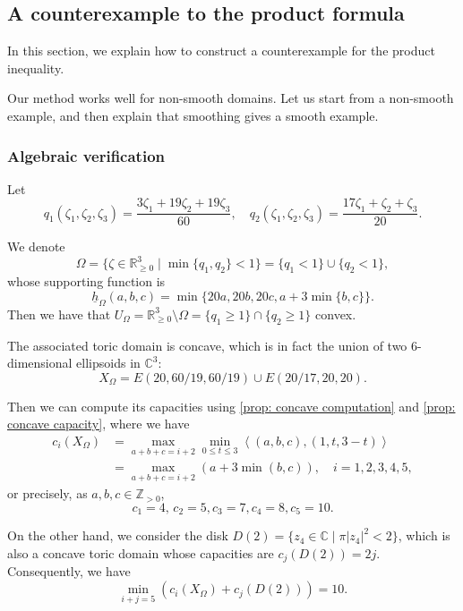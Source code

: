 \documentclass[11pt]{amsart}
\numberwithin{equation}{section}
\theoremstyle{plain}
\theoremstyle{definition}
\theoremstyle{remark}
\newcommand{\bC} { {\mathbb{C}}}
\newcommand{\bZ} { {\mathbb{Z}}}
\newcommand{\bR} { {\mathbb{R}}}
\begin{document}
\subsection{A counterexample to the product formula}\label{section: product counterexample}

In this section, we explain how to construct a counterexample for the product inequality. 

Our method works well for non-smooth domains. Let us start from a non-smooth example, and then explain that smoothing gives a smooth example.
\subsubsection{Algebraic verification}


Let 
\begin{equation}\label{equation: defining function for the product example, concave factor}
q_1(\zeta_1,\zeta_2,\zeta_3)=\frac{3\zeta_1+19\zeta_2+19\zeta_3}{60},\quad q_2(\zeta_1,\zeta_2,\zeta_3)=\frac{17\zeta_1+\zeta_2+\zeta_3}{20}.    
\end{equation}

We denote
\[\Omega=\{\zeta\in \bR^3_{\geq 0}\mid \min\{q_1,q_2\}<1\}=\{q_1<1\}\cup \{q_2<1\},\]
whose supporting function is
\[\underline{h}_\Omega(a,b,c)=\min\{20a,20b,20c,a+3\min\{b,c\}\}.\]
Then we have that $U_\Omega=\bR^3_{\geq 0}\setminus \Omega=\{q_1\geq 1\}\cap \{q_2\geq 1\}$ convex. 

The associated toric domain is concave, which is in fact the union of two $ 6$-dimensional ellipsoids in $\bC^3$:
\[X_\Omega=E(20,60/19,60/19)\cup E(20/17,20,20).\]

Then we can compute its capacities using \autoref{prop: concave computation} and \autoref{prop: concave capacity}, where we have
\begin{align*}c_i(X_\Omega)&=\max_{a+b+c=i+2}\min_{0\leq t\leq 3}\left<(a, b, c), (1, t, 3-t)\right>\\
&=\max_{a+b+c=i+2}(a+3\min(b,c)), \quad i=1,2,3,4,5,\end{align*}
or precisely, as $a, b, c\in \bZ_{>0}$,
\[c_1=4,\,c_2=5,c_3=7,c_4=8,c_5=10.\]

On the other hand, we consider the disk $D(2)=\{z_4\in \bC\mid \pi|z_4|^2<2\}$, which is also a concave toric domain whose capacities are $c_j(D (2))=2j$. Consequently, we have
\[\min_{i+j=5}(c_i(X_\Omega)+c_j(D(2)))=10.\]
\end{document}
